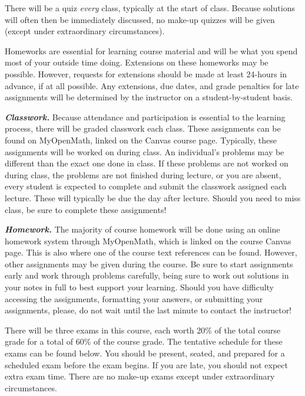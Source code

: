 \documentclass[11pt,letterpaper]{article}
\begin{document}
There will be a quiz \textit{every} class, typically at the start of class. Because solutions will often then be immediately discussed, no make-up quizzes will be given (except under extraordinary circumstances). \sectionbreak



Homeworks are essential for learning course material and will be what you spend most of your outside time doing. Extensions on these homeworks may be possible. However, requests for extensions should be made at least 24-hours in advance, if at all possible. Any extensions, due dates, and grade penalties for late assignments will be determined by the instructor on a student-by-student basis. 



\newpage



{\itshape\bfseries\color{stacred}Classwork.} Because attendance and participation is essential to the learning process, there will be graded classwork each class. These assignments can be found on MyOpenMath, linked on the Canvas course page. Typically, these assignments will be worked on during class. An individual's problems may be different than the exact one done in class. If these problems are not worked on during class, the problems are not finished during lecture, or you are absent, every student is expected to complete and submit the classwork assigned each lecture. These will typically be due the day after lecture. Should you need to miss class, be sure to complete these assignments! \pspace

{\itshape\bfseries\color{stacred}Homework.} The majority of course homework will be done using an online homework system through MyOpenMath, which is linked on the course Canvas page. This is also where one of the course text references can be found. However, other assignments may be given during the course. Be sure to start assignments early and work through problems carefully, being sure to work out solutions in your notes in full to best support your learning. Should you have difficulty accessing the assignments, formatting your answers, or submitting your assignments, please, do not wait until the last minute to contact the instructor! \sectionbreak



There will be three exams in this course, each worth 20\% of the total course grade for a total of 60\% of the course grade. The tentative schedule for these exams can be found below. You should be present, seated, and prepared for a scheduled exam before the exam begins. If you are late, you should not expect extra exam time. There are no make-up exams except under extraordinary circumstances. \sectionbreak
\end{document}
